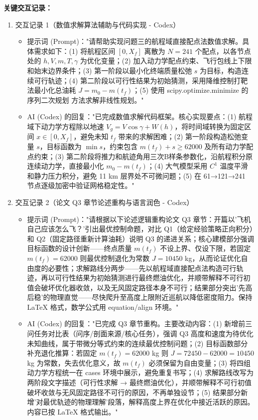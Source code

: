 \documentclass[withoutpreface,bwprint]{cumcmthesis}
\begin{document}
\textbf{关键交互记录：}
\begin{enumerate}[leftmargin=*]
    \item 交互记录 1（数值求解算法辅助与代码实现 - Codex）
    \begin{itemize}
    \item 提示词 (Prompt)："请帮助实现问题三的航程域直接配点法数值求解。具体需求如下：(1) 将航程区间 $[0, X_f]$ 离散为 $N=241$ 个配点，以各节点处的 $h, V, m, T, \gamma$ 为优化变量；(2) 加入动力学配点约束、飞行包线上下限和始末边界条件；(3) 第一阶段以最小化终端质量松弛 $s$ 为目标，构造连续可行轨迹；(4) 第二阶段以可行性结果为初始猜测，采用降维控制打靶法最小化总油耗 $J=m_0-m(t_f)$；(5) 使用 scipy.optimize.minimize 的 序列二次规划 方法求解非线性规划。"
    \item AI (Codex) 的回复："已完成数值求解代码框架。核心实现要点：(1) 航程域下动力学方程除以地速 $V_g=V\cos\gamma+W(h)$，将时间域转换为固定区间 $x\in[0,X_f]$，避免未知 $t_f$ 带来的求解困难；(2) 第一阶段构造松弛变量 $s$，目标函数为 $\min s$，约束包含 $m(t_f)+s\geq 62000$ 及所有动力学配点约束；(3) 第二阶段将推力和航迹角用三次B样条参数化，沿航程积分原连续动力学，直接最小化 $m_0-m(t_f)$；(4) 大气模型采用 $C^1$ 温度平滑和静力压力积分，避免 11 km 层界处不可微问题；(5) 在 61→121→241 节点逐级加密中验证网格稳定性。"
    \end{itemize}
    \item 交互记录 2（论文 Q3 章节论述重构与语言润色 - Codex）
    \begin{itemize}
    \item 提示词 (Prompt)："请根据以下论述逻辑重构论文 Q3 章节：开篇以'飞机自己应该怎么飞？'引出最优控制命题，对比 Q1（给定经验策略正向积分）和 Q2（固定路径重新计算油耗）说明 Q3 的递进关系；核心建模部分强调目标函数的设计创新——终点质量 $m(t_f)$ 不设上界、仅设下限，若固定 $m(t_f)=62000$ 则最优控制退化为常数 $J=10450$ kg，从而论证优化自由度的必要性；求解路线分两步——先以航程域直接配点法构造可行轨迹，再以可行性结果为初始猜测进行最终燃油优化，并顺带解释不可行初值会破坏优化器收敛，以及无风固定路径本身不可行；结果部分突出'先高后稳'的物理直觉——尽快爬升至高度上限附近巡航以降低密度阻力。保持 LaTeX 格式，数学公式用 equation/align 环境。"
    \item AI (Codex) 的回复："已完成 Q3 章节重构。主要改动内容：(1) 新增前三问任务对比表（问序/剖面来源/核心任务），强调 Q3 高度和速度为待优化未知曲线，属于带微分等式约束的连续最优控制问题；(2) 目标函数部分补充退化推算：若固定 $m(t_f)=62000$ kg 则 $J=72450-62000=10450$ kg 为常数，失去优化意义，故 $m(t_f)$ 必须保留为自由变量；(3) 将四组动力学方程统一在 cases 环境中展示，避免重复书写；(4) 求解路线改写为两阶段文字描述（可行性求解 → 最终燃油优化），并顺带解释不可行初值破坏收敛与无风固定路径不可行的原因，不再单独设节；(5) 结果部分新增'对最优轨迹的物理理解'段落，解释高度上界在优化中接近活跃的原因。内容已按 LaTeX 格式输出。"

\end{itemize}
\end{enumerate}
\end{document}
